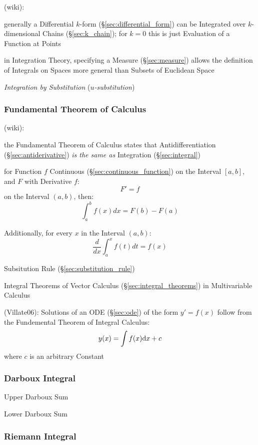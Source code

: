 (wiki):

generally a Differential $k$-form (\S\ref{sec:differential_form}) can be
Integrated over $k$-dimensional Chains (\S\ref{sec:k_chain}); for $k=0$ this is
just Evaluation of a Function at Points

in Integration Theory, specifying a Measure (\S\ref{sec:measure}) allows the
definition of Integrals on Spaces more general than Subsets of Euclidean Space

\asterism

\emph{Integration by Substitution} (\emph{$u$-substitution})



\subsubsection{Fundamental Theorem of Calculus}
\label{sec:fundamental_calculus_theorem}

(wiki):

the Fundamental Theorem of Calculus states that Antidifferentiation
(\S\ref{sec:antiderivative}) \emph{is the
  same as} Integration (\S\ref{sec:integral})

for Function $f$ Continuous (\S\ref{sec:continuous_function}) on the Interval
$[a,b]$, and $F$ with Derivative $f$:
\[
  F' = f
\]
on the Interval $(a,b)$, then:
\[
  \int_a^b f(x) dx = F(b) - F(a)
\]

Additionally, for every $x$ in the Interval $(a,b)$:
\[
  \frac{d}{dx}\int^x_a f(t) dt = f(x)
\]

\fist Subsitution Rule (\S\ref{sec:substitution_rule})

\fist Integral Theorems of Vector Calculus
(\S\ref{sec:integral_theorems}) in Multivariable Calculus

(Villate06): Solutions of an ODE (\S\ref{sec:ode}) of the form $y' = f(x)$
follow from the Fundemental Theorem of Integral Calculus:
\[
  y(x) = \int f(x) \mathrm{d}x + c
\]
where $c$ is an arbitrary Constant



\subsubsection{Darboux Integral}\label{sec:darboux_integral}

Upper Darboux Sum

Lower Darboux Sum



\subsubsection{Riemann Integral}\label{sec:riemann_integral}

